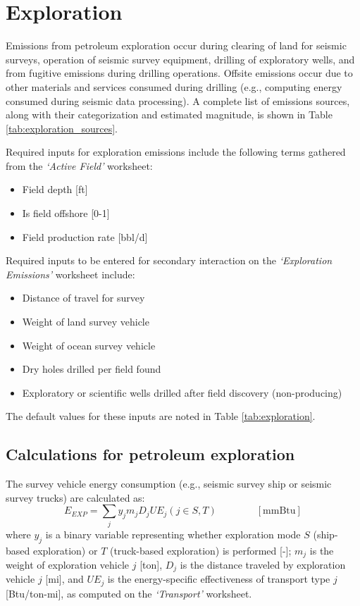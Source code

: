 \documentclass[11pt]{report}
\newcommand{\sheet}[1]{\textit{`{#1}'}}
\newcommand{\eqnunit}[1]{\quad\quad \scriptstyle{\left[\text{#1}\right]}}
\begin{document}
\clearpage
\section{Exploration}\label{sec:exploration}

Emissions from petroleum exploration occur during clearing of land for seismic surveys, operation of seismic survey equipment, drilling of exploratory wells, and from fugitive emissions during drilling operations. Offsite emissions occur due to other materials and services consumed during drilling (e.g., computing energy consumed during seismic data processing). A complete list of emissions sources, along with their categorization and estimated magnitude, is shown in Table \ref{tab:exploration_sources}.

Required inputs for exploration emissions include the following terms gathered from the \sheet{Active Field} worksheet:
\begin{itemize}
\item Field depth [ft]
\item Is field offshore [0-1]
\item Field production rate [bbl/d]
\end{itemize}

Required inputs to be entered for secondary interaction on the \sheet{Exploration Emissions} worksheet include:
\begin{itemize}
\item Distance of travel for survey
\item Weight of land survey vehicle
\item Weight of ocean survey vehicle
\item Dry holes drilled per field found
\item Exploratory or scientific wells drilled after field discovery (non-producing)
\end{itemize}
The default values for these inputs are noted in Table \ref{tab:exploration}.

\subsection{Calculations for petroleum exploration}

The survey vehicle energy consumption (e.g., seismic survey ship or seismic survey trucks) are calculated as:
\begin{equation}
\label{eq:trans_Etr}
E_{EXP} = \sum_{j} y_j m_j D_{j} UE_{j} (j \in S,T)  \quad\quad\eqnunit{mmBtu}
\end{equation}
where $y_j$ is a binary variable representing whether exploration mode $S$ (ship-based exploration) or $T$ (truck-based exploration) is performed [-]; $m_j$ is the weight of exploration vehicle $j$ [ton], $D_j$ is the distance traveled by exploration vehicle $j$ [mi], and $UE_{j}$ is the energy-specific effectiveness of transport type $j$ [Btu/ton-mi], as computed on the \sheet{Transport} worksheet.
\end{document}
